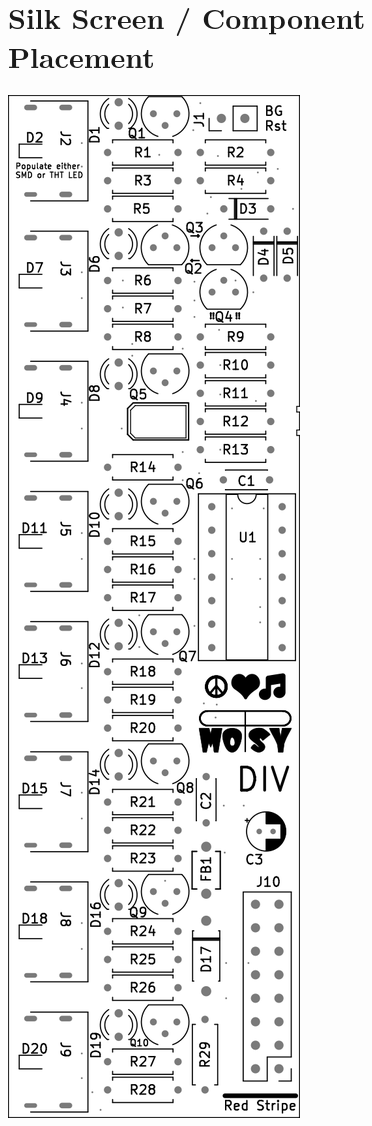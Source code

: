 \documentclass[a4paper,
               11pt,
               parskip=half,
               headinclude,
               titlepage=false]{scrartcl}
\begin{document}
\section*{Silk Screen / Component Placement}
\begin{center}
\begin{minipage}{.35\linewidth}
  \includegraphics[width=\linewidth]{div-F_Silkscreen}

\end{minipage}
\end{center}
\end{document}
